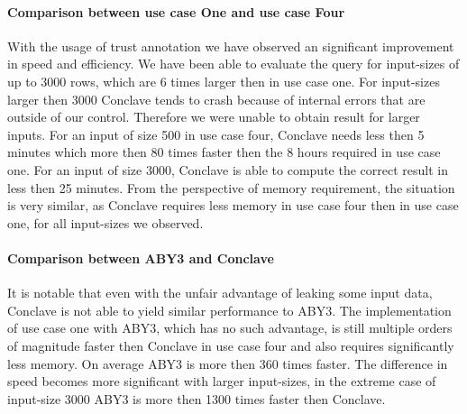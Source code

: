 \paragraph{Comparison between use case One and use case Four }
With the usage of trust annotation we have observed an significant improvement in speed and efficiency. We have been able to evaluate the query for input-sizes of up to 3000 rows, which are 6 times larger then in use case one. For input-sizes larger then 3000 Conclave tends to crash because of internal errors that are outside of our control. Therefore we were unable to obtain result for larger inputs.  For an input of size 500 in use case four, Conclave needs less then 5 minutes which more then 80 times faster then the 8 hours required in use case one. For an input of size 3000, Conclave is able to compute the correct result in less then 25 minutes. From the perspective of memory requirement, the situation is very similar, as Conclave requires less memory in use case four then in use case one, for all input-sizes we observed. 

\paragraph{Comparison between ABY3 and Conclave}
It is notable that even with the unfair advantage of leaking some input data, Conclave is not able to yield similar performance to ABY3. The implementation of use case one with ABY3, which has no such advantage, is still multiple orders of magnitude faster then Conclave in use case four and also requires significantly less memory. On average ABY3 is more then 360 times faster. The difference in speed becomes more significant with larger input-sizes, in the extreme case of input-size 3000 ABY3 is more then 1300 times faster then Conclave. 


